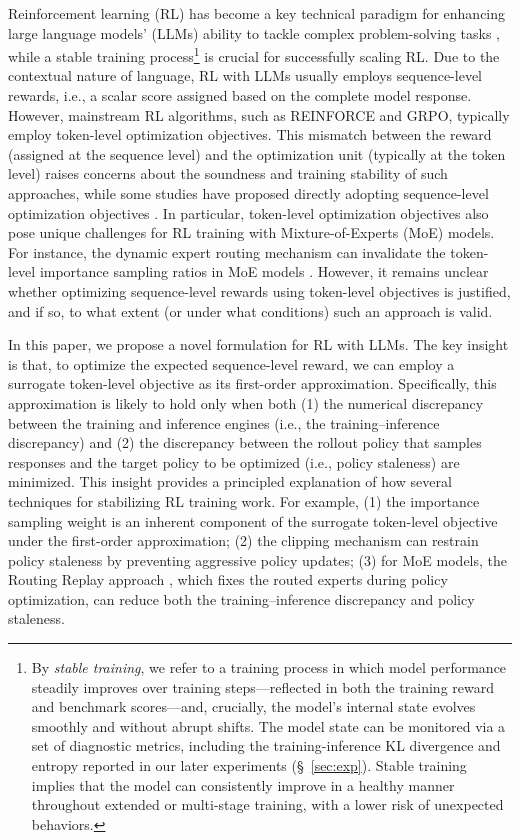 \documentclass{article}
\begin{document}
Reinforcement learning (RL) has become a key technical paradigm for enhancing large language models' (LLMs) ability to tackle complex problem-solving tasks \citep{o1,dpsk-r1,qwen3}, while a stable training process\footnote{
By \textit{stable training}, we refer to a training process in which model performance steadily improves over training steps—reflected in both the training reward and benchmark scores—and, crucially, the model’s internal state evolves smoothly and without abrupt shifts.
The model state can be monitored via a set of diagnostic metrics, including the training-inference KL divergence and entropy reported in our later experiments (\S~\ref{sec:exp}).
Stable training implies that the model can consistently improve in a healthy manner throughout extended or multi-stage training, with a lower risk of unexpected behaviors.
} is crucial for successfully scaling RL.
Due to the contextual nature of language, RL with LLMs usually employs sequence-level rewards, i.e., a scalar score assigned based on the complete model response.
However, mainstream RL algorithms, such as REINFORCE and GRPO, typically employ token-level optimization objectives.
This mismatch between the reward (assigned at the sequence level) and the optimization unit (typically at the token level) raises concerns about the soundness and training stability of such approaches, while some studies have proposed directly adopting sequence-level optimization objectives \citep{gspo,liu-li-2025-rl-collapse}.
In particular, token-level optimization objectives also pose unique challenges for RL training with Mixture-of-Experts (MoE) models.
For instance, the dynamic expert routing mechanism can invalidate the token-level importance sampling ratios in MoE models \citep{gspo}.
However, it remains unclear whether optimizing sequence-level rewards using token-level objectives is justified, and if so, to what extent (or under what conditions) such an approach is valid.

In this paper, we propose a novel formulation for RL with LLMs.
The key insight is that, to optimize the expected sequence-level reward, we can employ a surrogate token-level objective as its first-order approximation.
Specifically, this approximation is likely to hold only when both (1) the numerical discrepancy between the training and inference engines (i.e., the training–inference discrepancy) and (2) the discrepancy between the rollout policy that samples responses and the target policy to be optimized (i.e., policy staleness) are minimized.
This insight provides a principled explanation of how several techniques for stabilizing RL training work.
For example, 
(1) the importance sampling weight is an inherent component of the surrogate token-level objective under the first-order approximation;
(2) the clipping mechanism can restrain policy staleness by preventing aggressive policy updates;
(3) for MoE models, the Routing Replay approach \citep{gspo,r3}, which fixes the routed experts during policy optimization, can reduce both the training–inference discrepancy and policy staleness.
\end{document}
